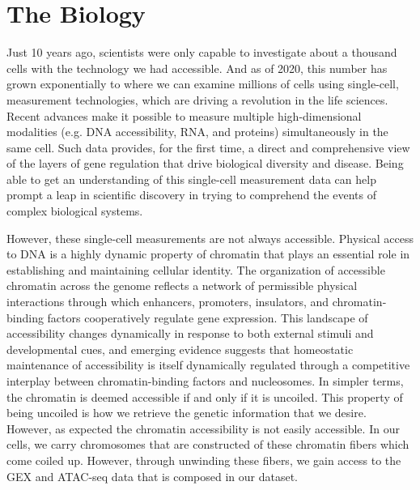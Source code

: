 \section{The Biology}

Just 10 years ago, scientists were only capable to investigate about a thousand cells with the technology we had accessible. 
And as of 2020, this number has grown exponentially to where we can examine millions of cells using single-cell, measurement technologies, which are driving a revolution in the life sciences. 
Recent advances make it possible to measure multiple high-dimensional modalities (e.g. DNA accessibility, RNA, and proteins) simultaneously in the same cell. Such data provides, for the first time, a direct and comprehensive view of the layers of gene regulation that drive biological diversity and disease. 
Being able to get an understanding of this single-cell measurement data can help prompt a leap in scientific discovery in trying to comprehend the events of complex biological systems. 

However, these single-cell measurements are not always accessible. Physical access to DNA is a highly dynamic property of chromatin that plays an essential role in establishing and maintaining cellular identity. The organization of accessible chromatin across the genome reflects a network of permissible physical interactions through which enhancers, promoters, insulators, and chromatin-binding factors cooperatively regulate gene expression. This landscape of accessibility changes dynamically in response to both external stimuli and developmental cues, and emerging evidence suggests that homeostatic maintenance of accessibility is itself dynamically regulated through a competitive interplay between chromatin-binding factors and nucleosomes. In simpler terms, the chromatin is deemed accessible if and only if it is uncoiled. This property of being uncoiled is how we retrieve the genetic information that we desire. However, as expected the chromatin accessibility is not easily accessible. In our cells, we carry chromosomes that are constructed of these chromatin fibers which come coiled up. However, through unwinding these fibers, we gain access to the GEX and ATAC-seq data that is composed in our dataset.

